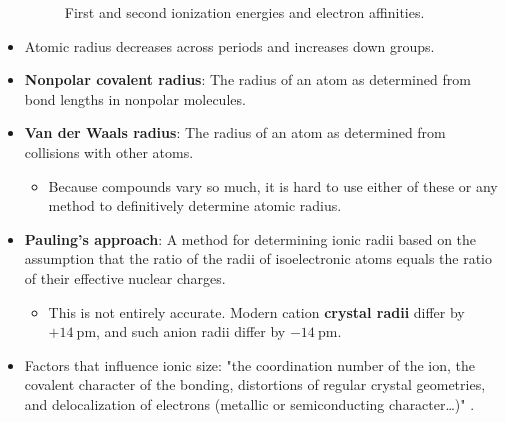 \documentclass[../main.tex]{subfiles}
\begin{document}
\begin{itemize}
\begin{figure}[h!]
        \caption{First and second ionization energies and electron affinities.}
        \label{fig:IE-EA}
    \end{figure}
    \item Atomic radius decreases across periods and increases down groups.
    \item \textbf{Nonpolar covalent radius}: The radius of an atom as determined from bond lengths in nonpolar molecules.
    \item \textbf{Van der Waals radius}: The radius of an atom as determined from collisions with other atoms.
    \begin{itemize}
        \item Because compounds vary so much, it is hard to use either of these or any method to definitively determine atomic radius.
    \end{itemize}
    \item \textbf{Pauling's approach}: A method for determining ionic radii based on the assumption that the ratio of the radii of isoelectronic atoms equals the ratio of their effective nuclear charges.
    \begin{itemize}
        \item This is not entirely accurate. Modern cation \textbf{crystal radii} differ by $+\SI{14}{\pico\meter}$, and such anion radii differ by $-\SI{14}{\pico\meter}$.
    \end{itemize}
    \item Factors that influence ionic size: "the coordination number of the ion, the covalent character of the bonding, distortions of regular crystal geometries, and delocalization of electrons (metallic or semiconducting character\dots)" \parencite[40]{bib:MiesslerFischerTarr}.
\end{itemize}
\end{document}
